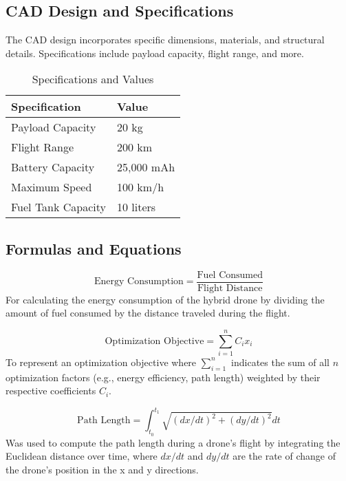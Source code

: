 \documentclass[preprint,12pt]{elsarticle}
\begin{document}
\subsection{CAD Design and Specifications}
The CAD design incorporates specific dimensions, materials, and structural details. Specifications include payload capacity, flight range, and more.


\begin{table}[!htbp]
\centering
\caption{Specifications and Values}
\begin{tabular}{|l|l|}
\hline
Specification       & Value             \\
\hline
Payload Capacity    & 20 kg             \\
Flight Range        & 200 km            \\
Battery Capacity    & 25,000 mAh        \\
Maximum Speed       & 100 km/h          \\
Fuel Tank Capacity   & 10 liters         \\
\hline
\end{tabular}
\end{table}

\subsection{Formulas and Equations}

\begin{equation}
\text{Energy Consumption} = \frac{\text{Fuel Consumed}}{\text{Flight Distance}}
\end{equation}
For calculating the energy consumption of the hybrid drone by dividing the amount of fuel consumed by the distance traveled during the flight.

\begin{equation}
\text{Optimization Objective} = \sum_{i=1}^{n} C_i x_i
\end{equation}
To represent an optimization objective where \(\sum_{i=1}^{n}\) indicates the sum of all \(n\) optimization factors (e.g., energy efficiency, path length) weighted by their respective coefficients \(C_i\).

\begin{equation}
\text{Path Length} = \int_{t_0}^{t_1} \sqrt{(dx/dt)^2 + (dy/dt)^2} dt
\end{equation}
Was used to compute the path length during a drone's flight by integrating the Euclidean distance over time, where \(dx/dt\) and \(dy/dt\) are the rate of change of the drone's position in the x and y directions.
\end{document}
